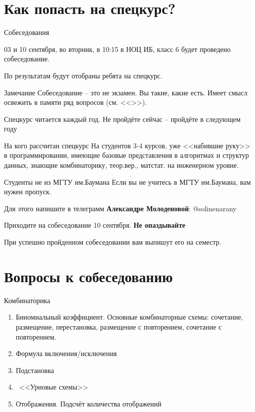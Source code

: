 \documentclass{beamer}
\newcommand{\рис}[1]{рис.\ref{#1}}
\newcommand{\Рис}[1]{Рис.\ref{#1}}
\newcommand{\таблицa}[1]{таблица~№\ref{#1}} %
\newcommand{\таблицы}[1]{таблицы~№\ref{#1}} %
\newcommand{\таблице}[1]{таблице~№\ref{#1}} %
\newcommand{\таблицу}[1]{таблицу~№\ref{#1}} %
\newcommand{\таблицей}[1]{таблицей~№\ref{#1}} %
\newcommand{\Таблицa}[1]{Таблица~№\ref{#1}} %
\newcommand{\Таблицы}[1]{Таблицы~№\ref{#1}} %
\newcommand{\Таблице}[1]{Таблице~№\ref{#1}} %
\newcommand{\Таблицу}[1]{Таблицу~№\ref{#1}} %
\newcommand{\Таблицей}[1]{Таблицей~№\ref{#1}} %
\begin{document}
  \section{Как попасть на спецкурс?}\label{section:how_to}
  
  \begin{frame}{Собеседования}
  
  03 и 10 сентября, во вторник, в 10:15 в НОЦ ИБ, класс 6
  будет проведено собеседование. 
	
  По результатам будут отобраны ребята на спецкурс.

   \begin{block}{Замечание}
   	Собеседование -- это не экзамен. Вы такие, какие есть. 
   	Имеет смысл освежить в памяти ряд вопросов 
   	(см. <<>>).
   	
   	Спецкурс читается каждый год. Не пройдёте сейчас -- 
   	пройдёте в следующем году
   \end{block}
  
  \end{frame}
  
  \begin{frame}{На кого рассчитан спецкурс}
  На студентов 3-4 курсов, уже <<набившие руку>> в программировании,
  имеющие базовые представления в алгоритмах и структур данных,
  знающие комбинаторику, теор.вер., матстат. на инженерном уровне.
  
  \end{frame}

  \begin{frame}{Студенты не из МГТУ им.Баумана}
  Если вы не учитесь в МГТУ им.Баумана, вам нужен пропуск.
  
  Для этого напишите в телеграмм \textbf{Александре Молоденовой}: @solinenarany
  
  Приходите на собеседование 10 сентября. 
  \textbf{Не опаздывайте}
  
  При успешно пройденном собеседовании вам выпишут его на семестр.
  \end{frame}
  
  \section{Вопросы к собеседованию}\label{section:quastions}
  
  \begin{frame}{Комбинаторика}
  \begin{enumerate}
  	\item Биномиальный коэффициент. Основные комбинаторные схемы: сочетание, размещение, перестановка, размещение с повторением, сочетание с повторением.
  	\item Формула включения/исключения
  	\item Подстановка
  	\item ~<<Урновые схемы>>
  	\item Отображения. Подсчёт количества отображений
  \end{enumerate}
  \end{frame}
  
\end{document}
